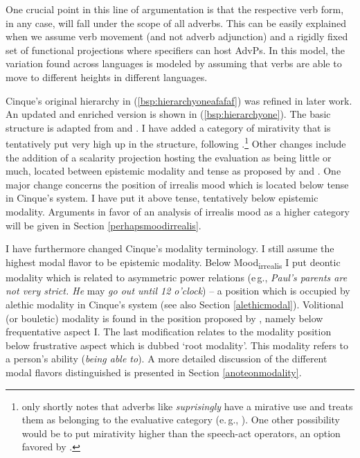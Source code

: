 \noindent One crucial point in this line of argumentation is that the respective verb form, in any case, will fall under the scope of all adverbs. This can be easily explained when we assume verb movement (and not adverb adjunction) and a rigidly fixed set of functional projections where specifiers can host AdvPs. In this model, the variation found across languages is modeled by assuming that verbs are able to move to different heights in different languages. 

Cinque's original hierarchy in (\ref{bsp:hierarchyoneafafaf}) was refined in later work. An updated and enriched version is shown in (\ref{bsp:hierarchyone}). The basic structure is adapted from \citet{cinque1999adverbs} and \citet{cinque2006restructuring}. I have added a category of mirativity that is tentatively put very high up in the structure,\label{mirmir} following \citet[317]{testcari2013}.\footnote{ \citet[183]{cinque2006restructuring} only shortly notes that adverbs like \textit{suprisingly} have a mirative use and treats them as belonging to the evaluative category (e.\,g., \citealt[201]{cinque1999adverbs}). One other possibility would be to put mirativity higher than the speech-act operators, an option favored by \citet[57--59]{varley2014evidentiality}.} Other changes include the addition of a scalarity projection hosting the evaluation as being little or much, located between epistemic modality and tense as proposed by \citet{hole2015distributed} and \citet{bross2017scope}. One major change concerns the position of irrealis mood which is located below tense in Cinque's system. I have put it above tense, tentatively below epistemic modality. Arguments in favor of an analysis of irrealis mood as a higher category will be given in Section \ref{perhapsmoodirrealis}.

I have furthermore changed Cinque's modality terminology. I still assume the highest modal flavor to be epistemic modality. Below Mood\textsubscript{irrealis} I put deontic modality which is related to asymmetric power relations (e\,g., \textit{Paul's parents are not very strict. He} may \textit{go out until 12 o'clock}) -- a position which is occupied by alethic modality in Cinque's system (see also Section \ref{alethicmodal}). Volitional (or bouletic) modality is found in the position proposed by \citet{cinque1999adverbs}, namely below frequentative aspect I. The last modification relates to the modality position below frustrative aspect which is dubbed `root modality'. This modality refers to a person's ability (\textit{being able to}). A more detailed discussion of the different modal flavors distinguished is presented in Section \ref{anoteonmodality}.

